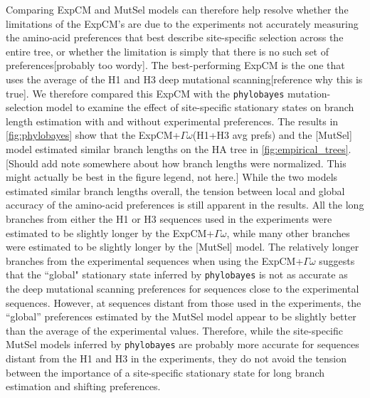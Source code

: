 \documentclass[11pt]{article}
\newcommand\jdbcomment[1]{{\color{red}[#1]}}
\begin{document}
Comparing ExpCM and MutSel models can therefore help resolve whether the limitations of the ExpCM's are due to the experiments not accurately measuring the amino-acid preferences that best describe site-specific selection across the entire tree, or whether the limitation is simply that there is no such set of preferences\jdbcomment{probably too wordy}.
The best-performing ExpCM is the one that uses the average of the H1 and H3 deep mutational scanning\jdbcomment{reference why this is true}.
We therefore compared this ExpCM with the \texttt{phylobayes} mutation-selection model to examine the effect of site-specific stationary states on branch length estimation with and without experimental preferences. 
The results in \ref{fig:phylobayes} show that the ExpCM+$\Gamma\omega$(H1+H3 avg prefs) and the \jdbcomment{MutSel} model estimated similar branch lengths on the HA tree in \ref{fig:empirical_trees}. 
\jdbcomment{Should add note somewhere about how branch lengths were normalized. This might actually be best in the figure legend, not here.}
While the two models estimated similar branch lengths overall, the tension between local and global accuracy of the amino-acid preferences is still apparent in the results. 
All the long branches from either the H1 or H3 sequences used in the experiments were estimated to be slightly longer by the ExpCM+$\Gamma\omega$, while many other branches were estimated to be slightly longer by the \jdbcomment{MutSel} model. 
The relatively longer branches from the experimental sequences when using the ExpCM+$\Gamma\omega$ suggests that the ``global" stationary state inferred by \texttt{phylobayes} is not as accurate as the deep mutational scanning preferences for sequences close to the experimental sequences. 
However, at sequences distant from those used in the experiments, the ``global'' preferences estimated by the MutSel model appear to be slightly better than the average of the experimental values.
Therefore, while the site-specific MutSel models inferred by \texttt{phylobayes} are probably more accurate for sequences distant from the H1 and H3 in the experiments, they do not avoid the tension between the importance of a site-specific stationary state for long branch estimation and shifting preferences. 
\end{document}
